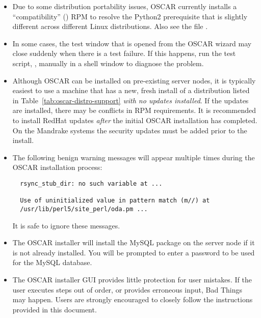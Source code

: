 \begin{itemize}
\item Due to some distribution portability issues, OSCAR currently installs
  a ``compatibility''  () RPM to resolve the
  Python2 prerequisite that is slightly different across different Linux
  distributions.  Also see the file .

\item In some cases, the test window that is opened from the 
  OSCAR wizard may close suddenly when there is a test failure. If
  this happens, run the test script, ,
  manually in a shell window to diagnose the problem.
 
\item Although OSCAR can be installed on pre-existing server nodes, it
  is typically easiest to use a machine that has a new, fresh install
\begchange
  of a distribution listed in Table~\ref{tab:oscar-distro-support}
  {\em with no updates installed}.  If the updates are installed,
  there may be conflicts in RPM requirements.  It is recommended to
  install RedHat updates {\em after} the initial OSCAR installation has
  completed.  On the Mandrake systems the security updates must be added
  prior to the install.
  
\item The following benign warning messages will appear multiple times
  during the OSCAR installation process:

\begin{verbatim}
  rsync_stub_dir: no such variable at ...

  Use of uninitialized value in pattern match (m//) at 
  /usr/lib/perl5/site_perl/oda.pm ...
\end{verbatim}
\endchange

  It is safe to ignore these messages.
  
\item The OSCAR installer will install the MySQL package on the server
  node if it is not already installed.  You will be prompted to enter a
\begchange
  password to be used for the MySQL database.
\endchange  

\item The OSCAR installer GUI provides little protection for user
  mistakes.  If the user executes steps out of order, or provides
  erroneous input, Bad Things may happen.  Users are strongly
  encouraged to closely follow the instructions provided in this
  document.


\end{itemize}
